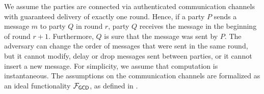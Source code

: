 We assume the parties are connected via authenticated communication channels with guaranteed 
delivery of exactly one round. Hence, if a party $P$ sends a message $m$ to party $Q$ in round 
$r$, party $Q$ receives the message in the beginning of round $r + 1$. Furthermore, $Q$ is sure 
that the message was sent by $P$. The adversary can change the order of messages  that were sent in the same round, 
but it cannot modify, delay or drop messages sent between parties, or it cannot insert a new 
message. For simplicity, we assume that computation is instantaneous. The assumptions on the 
communication channels are formalized as an ideal functionality $\mathcal{F}_{\mathsf{GCD}}$, as defined 
in \cite{mpvsc}.


